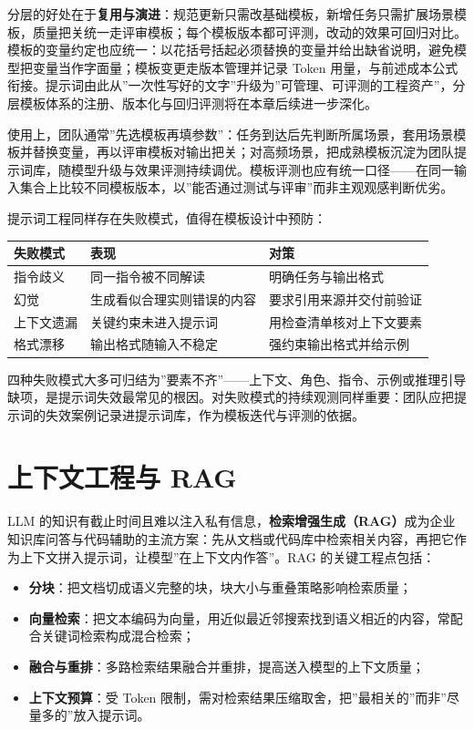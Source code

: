 \documentclass[
]{ctexbook}
\providecommand{\tightlist}{\setlength{\itemsep}{0pt}\setlength{\parskip}{0pt} }
\newcounter{none}
\begin{document}
分层的好处在于\textbf{复用与演进}：规范更新只需改基础模板，新增任务只需扩展场景模板，质量把关统一走评审模板；每个模板版本都可评测，改动的效果可回归对比。模板的变量约定也应统一：以花括号括起必须替换的变量并给出缺省说明，避免模型把变量当作字面量；模板变更走版本管理并记录
Token
用量，与前述成本公式衔接。提示词由此从''一次性写好的文字''升级为''可管理、可评测的工程资产''，分层模板体系的注册、版本化与回归评测将在本章后续进一步深化。

使用上，团队通常''先选模板再填参数''：任务到达后先判断所属场景，套用场景模板并替换变量，再以评审模板对输出把关；对高频场景，把成熟模板沉淀为团队提示词库，随模型升级与效果评测持续调优。模板评测也应有统一口径------在同一输入集合上比较不同模板版本，以''能否通过测试与评审''而非主观观感判断优劣。

提示词工程同样存在失败模式，值得在模板设计中预防：

{\def\LTcaptype{none} %
\begin{longtable}[]{@{}lll@{}}
\toprule\noalign{}
失败模式 & 表现 & 对策 \\
\midrule\noalign{}
\endhead
\bottomrule\noalign{}
\endlastfoot
指令歧义 & 同一指令被不同解读 & 明确任务与输出格式 \\
幻觉 & 生成看似合理实则错误的内容 & 要求引用来源并交付前验证 \\
上下文遗漏 & 关键约束未进入提示词 & 用检查清单核对上下文要素 \\
格式漂移 & 输出格式随输入不稳定 & 强约束输出格式并给示例 \\
\end{longtable}
}

四种失败模式大多可归结为''要素不齐''------上下文、角色、指令、示例或推理引导缺项，是提示词失效最常见的根因。对失败模式的持续观测同样重要：团队应把提示词的失效案例记录进提示词库，作为模板迭代与评测的依据。

\section{上下文工程与
RAG}\label{ux4e0aux4e0bux6587ux5de5ux7a0bux4e0e-rag}

LLM
的知识有截止时间且难以注入私有信息，\textbf{检索增强生成（RAG）}成为企业知识库问答与代码辅助的主流方案：先从文档或代码库中检索相关内容，再把它作为上下文拼入提示词，让模型''在上下文内作答''。RAG
的关键工程点包括：

\begin{itemize}
\tightlist
\item
  \textbf{分块}：把文档切成语义完整的块，块大小与重叠策略影响检索质量；
\item
  \textbf{向量检索}：把文本编码为向量，用近似最近邻搜索找到语义相近的内容，常配合关键词检索构成混合检索；
\item
  \textbf{融合与重排}：多路检索结果融合并重排，提高送入模型的上下文质量；
\item
  \textbf{上下文预算}：受 Token
  限制，需对检索结果压缩取舍，把''最相关的''而非''尽量多的''放入提示词。
\end{itemize}
\end{document}
